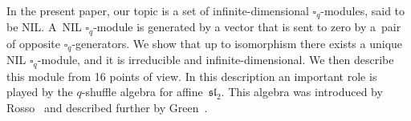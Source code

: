 In the present paper, our topic is a set of infinite-dimensional
 $\square_q$-modules, said to be NIL.
A~NIL $\square_q$-module is
generated by a vector that is sent to zero by a~pair of opposite $\square_q$-generators. We show that up to isomorphism
there exists a unique NIL
$\square_q$-module, and it is irreducible and infinite-dimensional.
We then describe this module from 16 points of view.
In this description an important role is played by
the $q$-shuffle algebra for affine~$\mathfrak{sl}_2$. This
algebra was introduced by
Rosso~\cite{rosso1} and described further by Green~\cite{green}.
